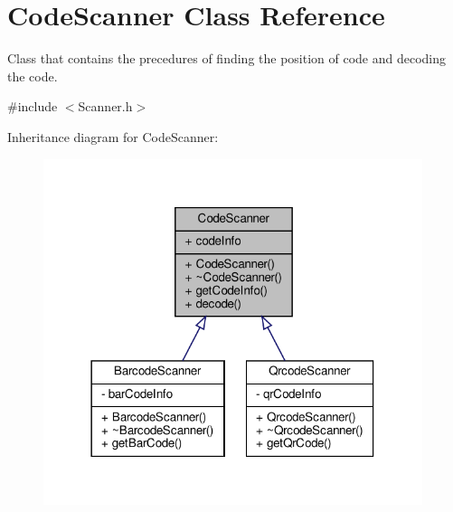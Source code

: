 \hypertarget{class_code_scanner}{}\section{Code\+Scanner Class Reference}
\label{class_code_scanner}


Class that contains the precedures of finding the position of code and decoding the code.  




{\ttfamily \#include $<$Scanner.\+h$>$}



Inheritance diagram for Code\+Scanner\+:\nopagebreak
\begin{figure}[H]
\begin{center}
\leavevmode
\includegraphics[width=314pt]{class_code_scanner__inherit__graph}
\end{center}
\end{figure}


